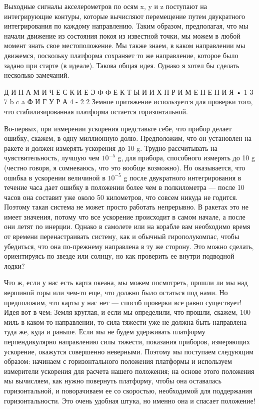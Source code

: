 \documentclass[10pt,oneside]{article}
\begin{document}
Выходные сигналы акселерометров по осям x, y и z поступают на интегрирующие контуры, которые вычисляют перемещение путем двукратного интегрирования по каждому направлению. Таким образом, предполагая, что мы начали движение из состояния покоя из известной точки, мы можем в любой момент знать свое местоположение. Мы также знаем, в каком направлении мы движемся, поскольку платформа сохраняет то же направление, которое было задано при старте (в идеале). Такова общая идея. Однако я хотел бы сделать несколько замечаний.\par

Д И Н А М И Ч Е С К И Е  Э Ф Ф Е К Т Ы  И  И Х  П Р И М Е Н Е Н И Я • 1 3 7 b c a Ф И Г У Р А  4 - 2 2 Земное притяжение используется для проверки того, что стабилизированная платформа остается горизонтальной.\par

Во-первых, при измерении ускорения представьте себе, что прибор делает ошибку, скажем, в одну миллионную долю. Предположим, что он установлен на ракете и должен измерять ускорения до 10 g. Трудно рассчитывать на чувствительность, лучшую чем \(10^{-5}\) g, для прибора, способного измерять до 10 g (честно говоря, я сомневаюсь, что это вообще возможно). Но оказывается, что ошибка в ускорении величиной в \(10^{-5}\) g после двукратного интегрирования в течение часа дает ошибку в положении более чем в полкилометра --- после 10 часов она составит уже около 50 километров, что совсем никуда не годится. Поэтому такая система не может просто работать непрерывно. В ракетах это не имеет значения, потому что все ускорение происходит в самом начале, а после они летят по инерции. Однако в самолете или на корабле вам необходимо время от времени перенастраивать систему, как и обычный гирополукомпас, чтобы убедиться, что она по-прежнему направлена в ту же сторону. Это можно сделать, ориентируясь по звезде или солнцу, но как проверить ее внутри подводной лодки?\par

Что ж, если у нас есть карта океана, мы можем посмотреть, прошли ли мы над вершиной горы или чем-то еще, что должно было остаться под нами. Но предположим, что карты у нас нет --- способ проверки все равно существует! Идея вот в чем: Земля круглая, и если мы определили, что прошли, скажем, 100 миль в каком-то направлении, то сила тяжести уже не должна быть направлена туда же, куда и раньше. Если мы не будем удерживать платформу перпендикулярно направлению силы тяжести, показания приборов, измеряющих ускорение, окажутся совершенно неверными. Поэтому мы поступаем следующим образом: начинаем с горизонтального положения платформы и используем измерители ускорения для расчета нашего положения; на основе этого положения мы вычисляем, как нужно повернуть платформу, чтобы она оставалась горизонтальной, и поворачиваем ее со скоростью, необходимой для поддержания горизонтальности. Это очень удобная штука, но именно она и спасает положение!\par
\end{document}
